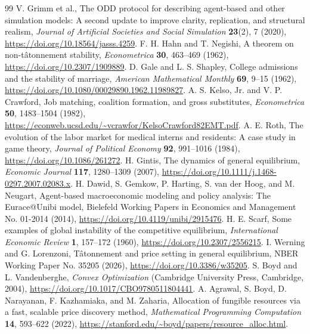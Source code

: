 \documentclass[10pt,a4paper,twocolumn]{article}
\begin{document}
\twocolumn
\balance
\begin{thebibliography}{99}
 V. Grimm et al., The ODD protocol for describing
agent-based and other simulation models: A second update to improve
clarity, replication, and structural realism,
\emph{Journal of Artificial Societies and Social Simulation} \textbf{23}(2), 7 (2020),
\url{https://doi.org/10.18564/jasss.4259}.
 F. H. Hahn and T. Negishi, A theorem on
non-t\^atonnement stability, \emph{Econometrica} \textbf{30}, 463--469 (1962),
\url{https://doi.org/10.2307/1909889}.
 D. Gale and L. S. Shapley, College admissions
and the stability of marriage, \emph{American Mathematical Monthly}
\textbf{69}, 9--15 (1962), \url{https://doi.org/10.1080/00029890.1962.11989827}.
 A. S. Kelso, Jr. and V. P. Crawford,
Job matching, coalition formation, and gross substitutes,
\emph{Econometrica} \textbf{50}, 1483--1504 (1982),
\url{https://econweb.ucsd.edu/~vcrawfor/KelsoCrawford82EMT.pdf}.
 A. E. Roth, The evolution of the labor market for
medical interns and residents: A case study in game theory,
\emph{Journal of Political Economy} \textbf{92}, 991--1016 (1984),
\url{https://doi.org/10.1086/261272}.
 H. Gintis, The dynamics of general equilibrium,
\emph{Economic Journal} \textbf{117}, 1280--1309 (2007),
\url{https://doi.org/10.1111/j.1468-0297.2007.02083.x}.
 H. Dawid, S. Gemkow, P. Harting, S. van der Hoog,
and M. Neugart, Agent-based macroeconomic modeling and policy analysis:
The Eurace@Unibi model, Bielefeld Working Papers in Economics and
Management No. 01-2014 (2014),
\url{https://doi.org/10.4119/unibi/2915476}.
 H. E. Scarf, Some examples of global instability of
the competitive equilibrium, \emph{International Economic Review}
\textbf{1}, 157--172 (1960),
\url{https://doi.org/10.2307/2556215}.
 I. Werning and G. Lorenzoni, T\^atonnement and
price setting in general equilibrium, NBER Working Paper No. 35205
(2026), \url{https://doi.org/10.3386/w35205}.
 S. Boyd and L. Vandenberghe,
\emph{Convex Optimization} (Cambridge University Press, Cambridge, 2004),
\url{https://doi.org/10.1017/CBO9780511804441}.
 A. Agrawal, S. Boyd, D. Narayanan,
F. Kazhamiaka, and M. Zaharia, Allocation of fungible resources via a
fast, scalable price discovery method, \emph{Mathematical Programming
Computation} \textbf{14}, 593--622 (2022),
\url{https://stanford.edu/~boyd/papers/resource_alloc.html}.
\end{thebibliography}
\end{document}

